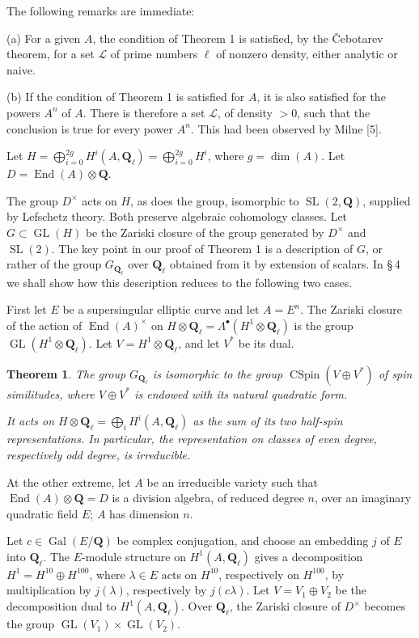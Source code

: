 \documentclass[11pt,a4paper]{article}
\theoremstyle{plain}
\newtheorem{theorem}{Theorem}
\theoremstyle{definition}
\DeclareMathOperator{\Gal}{Gal}
\DeclareMathOperator{\End}{End}
\DeclareMathOperator{\CSpin}{CSpin}
\DeclareMathOperator{\SL}{SL}
\DeclareMathOperator{\GL}{GL}
\begin{document}
The following remarks are immediate:

(a) For a given $A$, the condition of Theorem 1 is satisfied, by the \v{C}ebotarev theorem, for a set $\mathcal{L}$ of prime numbers $\ell$ of nonzero density, either analytic or naive.

(b) If the condition of Theorem 1 is satisfied for $A$, it is also satisfied for the powers $A^n$ of $A$. There is therefore a set $\mathcal{L}$, of density $> 0$, such that the conclusion is true for every power $A^n$. This had been observed by Milne [5].

Let $H = \bigoplus_{i=0}^{2g} H^i(A, \mathbf{Q}_\ell) = \bigoplus_{i=0}^{2g} H^i$, where $g = \dim(A)$. Let $D = \End(A) \otimes \mathbf{Q}$.

The group $D^\times$ acts on $H$, as does the group, isomorphic to $\SL(2, \mathbf{Q})$, supplied by Lefschetz theory. Both preserve algebraic cohomology classes. Let $G \subset \GL(H)$ be the Zariski closure of the group generated by $D^\times$ and $\SL(2)$. The key point in our proof of Theorem 1 is a description of $G$, or rather of the group $G_{\mathbf{Q}_\ell}$ over $\mathbf{Q}_\ell$ obtained from it by extension of scalars. In \S\,4 we shall show how this description reduces to the following two cases.

First let $E$ be a supersingular elliptic curve and let $A = E^n$. The Zariski closure of the action of $\End(A)^\times$ on $H \otimes \mathbf{Q}_\ell = \Lambda^\bullet(H^1 \otimes \mathbf{Q}_\ell)$ is the group $\GL(H^1 \otimes \mathbf{Q}_\ell)$. Let $V = H^1 \otimes \mathbf{Q}_\ell$, and let $V^*$ be its dual.

\begin{theorem}
The group $G_{\mathbf{Q}_\ell}$ is isomorphic to the group $\CSpin(V \oplus V^*)$ of spin similitudes, where $V \oplus V^*$ is endowed with its natural quadratic form.

It acts on $H \otimes \mathbf{Q}_\ell = \bigoplus_i H^i(A, \mathbf{Q}_\ell)$ as the sum of its two half-spin representations. In particular, the representation on classes of even degree, respectively odd degree, is irreducible.
\end{theorem}

At the other extreme, let $A$ be an irreducible variety such that $\End(A) \otimes \mathbf{Q} = D$ is a division algebra, of reduced degree $n$, over an imaginary quadratic field $E$; $A$ has dimension $n$.

Let $c \in \Gal(E/\mathbf{Q})$ be complex conjugation, and choose an embedding $j$ of $E$ into $\mathbf{Q}_\ell$. The $E$-module structure on $H^1(A, \mathbf{Q}_\ell)$ gives a decomposition $H^1 = H^{10} \oplus H^{100}$, where $\lambda \in E$ acts on $H^{10}$, respectively on $H^{100}$, by multiplication by $j(\lambda)$, respectively by $j(c\lambda)$. Let $V = V_1 \oplus V_2$ be the decomposition dual to $H^1(A, \mathbf{Q}_\ell)$. Over $\mathbf{Q}_\ell$, the Zariski closure of $D^\times$ becomes the group $\GL(V_1) \times \GL(V_2)$.
\end{document}
